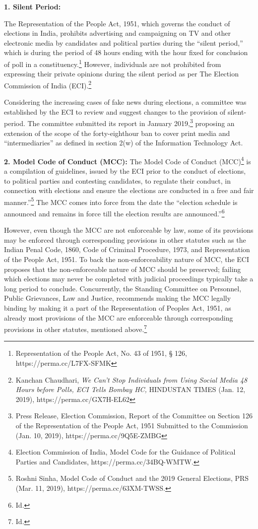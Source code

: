 \begin{multicols}{2}
\noi
{\large\bfseries 1. Silent Period:}

\noi
The Representation of the People Act, 1951, which governs the conduct of elections in India,
prohibits advertising and campaigning on TV and other electronic media by candidates and
political parties during the “silent period,” which is during the period of 48 hours ending with
the hour fixed for conclusion of poll in a constituency.\footnote{Representation of the People Act, No. 43 of 1951, § 126, https://perma.cc/L7FX-SFMK} However, individuals are not
prohibited from expressing their private opinions during the silent period as per The Election
Commission of India (ECI).\footnote{Kanchan Chaudhari, \textit{We Can’t Stop Individuals from Using Social Media 48 Hours before Polls, ECI Tells
Bombay HC,} HINDUSTAN TIMES (Jan. 12, 2019), https://perma.cc/GX7H-EL62}

\noi
Considering the increasing cases of fake news during elections, a committee was established
by the ECI to review and suggest changes to the provision of silent-period. The committee
submitted its report in January 2019,\footnote{Press Release, Election Commission, Report of the Committee on Section 126 of the Representation of the
People Act, 1951 Submitted to the Commission (Jan. 10, 2019), https://perma.cc/9Q5E-ZMBG} proposing an extension of the scope of the forty-eighthour 
ban to cover print media and “intermediaries” as defined in section 2(w) of the Information Technology Act.

\noi
{\large\bfseries 2. Model Code of Conduct (MCC):}
The Model Code of Conduct (MCC)\footnote{Election Commission of India, Model Code for the Guidance of Political Parties and
Candidates, https://perma.cc/34BQ-WMTW.} is a
compilation of guidelines, issued by the ECI prior to the conduct of elections, to political
parties and contesting candidates, to regulate their conduct, in connection with elections and
ensure the elections are conducted in a free and fair manner.”\footnote{Roshni Sinha, Model Code of Conduct and the 2019 General Elections, PRS (Mar. 11,
2019), https://perma.cc/63XM-TWSS.} The MCC comes into force
from the date the “election schedule is announced and remains in force till the election results
are announced.”\footnote{Id.}

\noi
However, even though the MCC are not enforceable by law, some of its provisions may be
enforced through corresponding provisions in other statutes such as the Indian Penal Code,
1860, Code of Criminal Procedure, 1973, and Representation of the People Act, 1951. To
back the non-enforceability nature of MCC, the ECI proposes that the non-enforceable nature
of MCC should be preserved; failing which elections may never be completed with judicial
proceedings typically take a long period to conclude. Concurrently, the Standing Committee
on Personnel, Public Grievances, Law and Justice, recommends making the MCC legally
binding by making it a part of the Representation of Peoples Act, 1951, as already most
provisions of the MCC are enforceable through corresponding provisions in other statutes,
mentioned above.\footnote{Id.}


\end{multicols}
